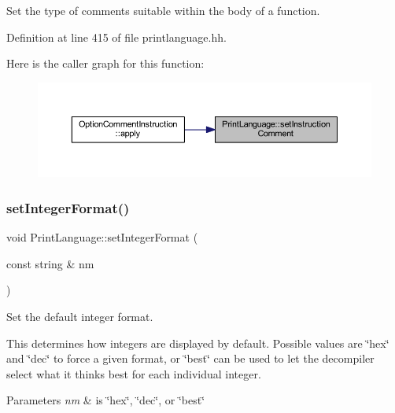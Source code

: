 Set the type of comments suitable within the body of a function. 



Definition at line 415 of file printlanguage.\+hh.

Here is the caller graph for this function\+:
\nopagebreak
\begin{figure}[H]
\begin{center}
\leavevmode
\includegraphics[width=350pt]{class_print_language_a74c68960b53e9db5de7a3cc3651fe652_icgraph}
\end{center}
\end{figure}
\mbox{\label{class_print_language_af001882863a1a4a2abefd75e8db5e593}} 
\subsubsection{\texorpdfstring{setIntegerFormat()}{setIntegerFormat()}}
{\footnotesize\ttfamily void Print\+Language\+::set\+Integer\+Format (\begin{DoxyParamCaption}\item[{const string \&}]{nm }\end{DoxyParamCaption})\hspace{0.3cm}{\ttfamily [virtual]}}



Set the default integer format. 

This determines how integers are displayed by default. Possible values are \char`\"{}hex\char`\"{} and \char`\"{}dec\char`\"{} to force a given format, or \char`\"{}best\char`\"{} can be used to let the decompiler select what it thinks best for each individual integer. 
\begin{DoxyParams}{Parameters}
{\em nm} & is \char`\"{}hex\char`\"{}, \char`\"{}dec\char`\"{}, or \char`\"{}best\char`\"{} \\
\hline
\end{DoxyParams}



